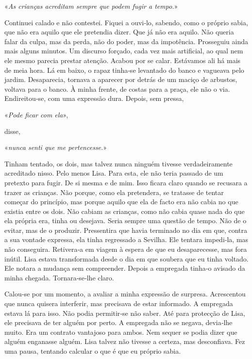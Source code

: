 «\emph{As crianças acreditam sempre que podem fugir a tempo.}»

Continuei calado e não contestei. Fiquei a ouvi­‑lo, sabendo, como o
próprio sabia, que não era aquilo que ele pretendia dizer. Que já não
era aquilo. Não queria falar da culpa, mas da perda, não do poder, mas
da impotência. Prosseguiu ainda mais alguns minutos. Um discurso
forçado, cada vez mais artificial, ao qual nem ele mesmo parecia prestar
atenção. Acabou por se calar. Estávamos ali há mais de meia hora. Lá em
baixo, o rapaz tinha­‑se levantado do banco e vagueava pelo jardim.
Desaparecia, tornava a aparecer por detrás de um maciço de arbustos,
voltava para o banco. À minha frente, de costas para a praça, ele não o
via. Endireitou­‑se, com uma expressão dura. Depois, sem pressa,

«\emph{Pode ficar com ela}»,

disse,

«\emph{nunca senti que me pertencesse.}»

Tinham tentado, os dois, mas talvez nunca ninguém tivesse
verdadeiramente acreditado nisso. Pelo menos Lisa. Para esta, ele não
teria passado de um pretexto para fugir. De si mesma e de mim. Isso
ficara claro quando se recusara a trazer as crianças. Não porque, como
ela pretendera, se tratasse de tentar começar do princípio, mas porque
aquilo que ela de facto era não cabia no que existia entre os dois. Não
cabiam as crianças, como não cabia quase nada do que ela própria era,
tinha ou desejava. Seria sempre uma questão de tempo. Não de o evitar,
mas de o produzir. Pressentira que havia terminado no dia em que, contra
a sua vontade expressa, ela tinha regressado a Sevilha. Ele tentara
impedi­‑la, mas não conseguira. Retivera­‑a em viagem à espera de que eu
desaparecesse, mas fora inútil. Lisa estava transformada desde o dia em
que soubera que eu tinha voltado. Ele notara a mudança sem compreender.
Depois a empregada tinha­‑o avisado da minha chegada. Tornara­‑se­‑lhe
claro.

Calou­‑se por um momento, a avaliar a minha expressão de surpresa.
Acrescentou que nunca quisera interferir, mas precisava de estar
informado. A empregada estava lá para isso. Não podia permitir­‑se não
saber. Até para protecção de Lisa, ele precisava de ter alguém por
perto. A empregada não se negava, devia­‑lhe muito. Era um contrato
vantajoso para ambos. Nem sequer se podia dizer que alguém enganasse
alguém. Lisa talvez não tivesse a certeza, mas desconfiava. Fez uma
pausa, tentando calcular o que é que eu próprio sabia.

